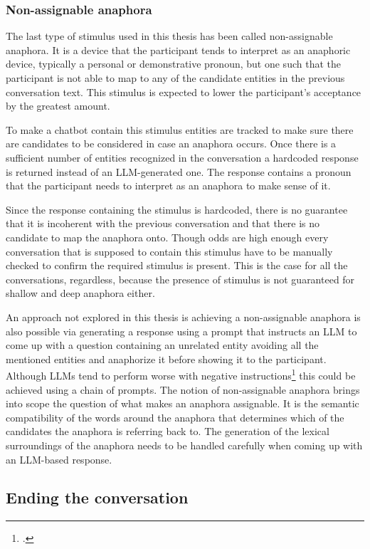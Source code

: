 \documentclass[12pt]{report}
\begin{document}
{\subsubsection{Non-assignable anaphora}

The last type of stimulus used in this thesis
has been called non-assignable anaphora.
It is a device that the participant tends to
interpret as an anaphoric device,
typically a personal or demonstrative pronoun,
but one such that the participant is not able
to map to any of the candidate entities
in the previous conversation text.
This stimulus is expected to lower the participant's acceptance
by the greatest amount.

To make a chatbot contain this stimulus
entities are tracked to make sure
there are candidates to be considered
in case an anaphora occurs.
Once there is a sufficient number of
entities recognized in the conversation
a hardcoded response is returned instead of an LLM-generated one.
The response contains a pronoun that
the participant needs to interpret as an anaphora to make sense of it.

Since the response containing the stimulus is hardcoded,
there is no guarantee
that it is incoherent with the previous conversation
and that there is no candidate to map the anaphora onto.
Though odds are high enough
every conversation that is supposed to contain this stimulus
have to be manually checked
to confirm the required stimulus is present.
This is the case for all the conversations, regardless,
because the presence of stimulus is not guaranteed
for shallow and deep anaphora either.

An approach not explored in this thesis is
achieving a non-assignable anaphora is also possible
via generating a response
using a prompt that instructs an LLM
to come up with a question containing an unrelated entity
avoiding all the mentioned entities
and anaphorize it before showing it to the participant.
Although LLMs tend to perform worse with negative instructions\footcite{negated_prompts}
this could be achieved using a chain of prompts.
The notion of non-assignable anaphora
brings into scope the question of
what makes an anaphora assignable.
It is the semantic compatibility of the words around the anaphora
that determines which of the candidates the anaphora is referring back to.
The generation of the lexical surroundings of the anaphora
needs to be handled carefully
when coming up with an LLM-based response.

\subsection{Ending the conversation}

}
\end{document}
